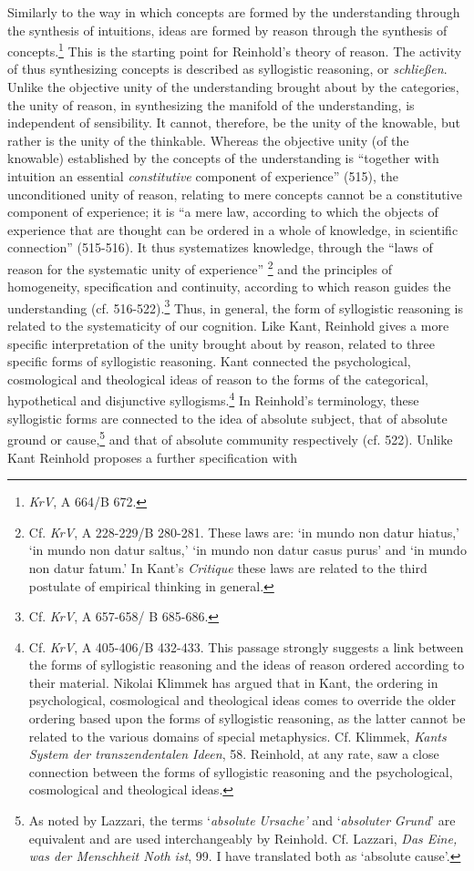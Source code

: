 Similarly to the way in which concepts are formed by the understanding through the synthesis of intuitions, ideas are formed by reason through the synthesis of concepts.\footnote{ \textit{KrV}, A 664/B 672.} This is the starting point for Reinhold's theory of reason. The activity of thus synthesizing concepts is described as syllogistic reasoning, or \textit{schlie\ss{}en}. Unlike the objective unity of the understanding brought about by the categories, the unity of reason, in synthesizing the manifold of the understanding, is independent of sensibility. It cannot, therefore, be the unity of the knowable, but rather is the unity of the thinkable. Whereas the objective unity (of the knowable) established by the concepts of the understanding is ``together with intuition an essential \textit{constitutive} component of experience'' (515), the unconditioned unity of reason, relating to mere concepts cannot be a constitutive component of experience; it is ``a mere law, according to which the objects of experience that are thought can be ordered in a whole of knowledge, in scientific connection'' (515{-}516). It thus systematizes knowledge, through the ``laws of reason for the systematic unity of experience'' \footnote{ Cf. \textit{KrV}, A 228{-}229/B 280{-}281. These laws are: `in mundo non datur hiatus,' `in mundo non datur saltus,' `in mundo non datur casus purus' and `in mundo non datur fatum.' In Kant's \textit{Critique} these laws are related to the third postulate of empirical thinking in general. } and the principles of homogeneity, specification and continuity, according to which reason guides the understanding (cf. 516{-}522).\footnote{ Cf. \textit{KrV}, A 657{-}658/ B 685{-}686. } Thus, in general, the form of syllogistic reasoning is related to the systematicity of our cognition. Like Kant, Reinhold gives a more specific interpretation of the unity brought about by reason, related to three specific forms of syllogistic reasoning. Kant connected the psychological, cosmological and theological ideas of reason to the forms of the categorical, hypothetical and disjunctive syllogisms.\footnote{ Cf. \textit{KrV}, A 405{-}406/B 432{-}433. This passage strongly suggests a link between the forms of syllogistic reasoning and the ideas of reason ordered according to their material. Nikolai Klimmek has argued that in Kant, the ordering in psychological, cosmological and theological ideas comes to override the older ordering based upon the forms of syllogistic reasoning, as the latter cannot be related to the various domains of special metaphysics. Cf. Klimmek, \textit{Kants System der transzendentalen Ideen}, 58. Reinhold, at any rate, saw a close connection between the forms of syllogistic reasoning and the psychological, cosmological and theological ideas. } In Reinhold's terminology, these syllogistic forms are connected to the idea of absolute subject, that of absolute ground or cause,\footnote{ As noted by Lazzari, the terms `\textit{absolute} \textit{Ursache'} and `\textit{absoluter} \textit{Grund}' are equivalent and are used interchangeably by Reinhold. Cf. Lazzari, \textit{Das Eine, was der Menschheit Noth ist}, 99. I have translated both as `absolute cause'. } and that of absolute community respectively (cf. 522). Unlike Kant Reinhold proposes a further specification with 